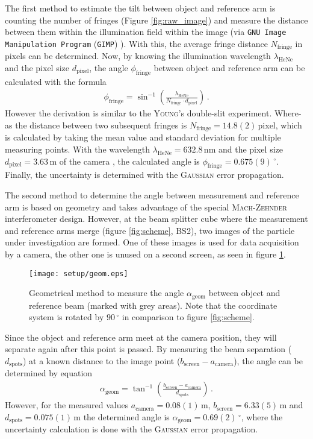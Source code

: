 \documentclass{article}
\begin{document}
The first method to estimate the tilt between object and reference arm is counting the number of fringes (Figure \ref{fig:raw_image}) and measure the distance between them within the illumination field within the image (via \texttt{GNU Image Manipulation Program} (\texttt{GIMP}) \cite{GIMP}). With this, the average fringe distance $N_\text{fringe}$ in pixels can be determined. Now, by knowing the illumination wavelength $\lambda_\text{HeNe}$ and the pixel size $d_\text{pixel}$, the angle $\phi_\text{fringe}$ between object and reference arm can be calculated with the formula
\begin{align}
    \phi_\text{fringe}=\sin^{-1}\left(\frac{\lambda_\text{HeNe}}{N_\text{fringe}\cdot d_\text{pixel}}\right)\,.
\end{align}
However the derivation is similar to the \textsc{Young}'s double-slit experiment.
Where- as the distance between two subsequent fringes is $N_\text{fringe}=14.8(2)\,$pixel, which is calculated by taking the mean value and standard deviation for multiple measuring points. With the wavelength $\lambda_\text{HeNe}=632.8\,$nm \cite{handbook} and the pixel size $d_\text{pixel}=3.63\,$\textmu m of the camera \cite{pointGrey}, the calculated angle is $\phi_\text{fringe}=0.675(9)\,^\circ$. Finally, the uncertainty is determined with the \textsc{Gaussian} error propagation.

The second method to determine the angle between measurement and reference arm is based on geometry and takes advantage of the special \textsc{Mach}-\textsc{Zehnder} interferometer design. However, at the beam splitter cube where the measurement and reference arms merge (figure \ref{fig:scheme}, BS2), two images of the particle under investigation are formed. One of these images is used for data acquisition by a camera, the other one is unused on a second screen, as seen in figure \ref{fig:geom}.
\begin{figure}
    \centering
    \texttt{[image: setup/geom.eps]}
    \caption{Geometrical method to measure the angle $\alpha_\text{geom}$ between object and reference beam (marked with grey areas). Note that the coordinate system is rotated by $90\,^\circ$ in comparison to figure \ref{fig:scheme}.}
    \label{fig:geom}
\end{figure}
Since the object and reference arm meet at the camera position, they will separate again after this point is passed. By measuring the beam separation ($d_\text{spots}$) at a known distance to the image point ($b_\text{screen}-a_\text{camera}$), the angle can be determined by equation
\begin{align}
    \alpha_\text{geom} = \tan^{-1} \left( \frac{b_\text{screen}-a_\text{camera}}{d_\text{spots}}\right)\,.
\end{align}
However, for the measured values $a_\text{camera}=0.08(1)$\,m, $b_\text{screen}=6.33(5)$\,m and $d_\text{spots}=0.075(1)$\,m the determined angle is $\alpha_\text{geom}=0.69(2)\,^\circ$, where the uncertainty calculation is done with the \textsc{Gaussian} error propagation.
\end{document}
